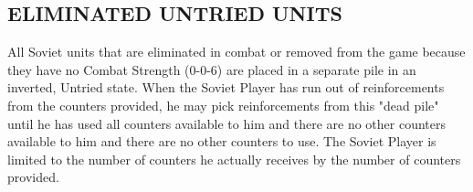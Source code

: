 \subsection{ELIMINATED UNTRIED UNITS}

All Soviet units that are eliminated in combat or removed from the game because they have no Combat Strength (0-0-6) are placed in a separate pile in an inverted, Untried state. When the Soviet Player has run out of reinforcements from the counters provided, he may pick reinforcements from this "dead pile" until he has used all counters available to him and there are no other counters available to him and there are no other counters to use. The Soviet Player is limited to the number of counters he actually receives by the number of counters provided.